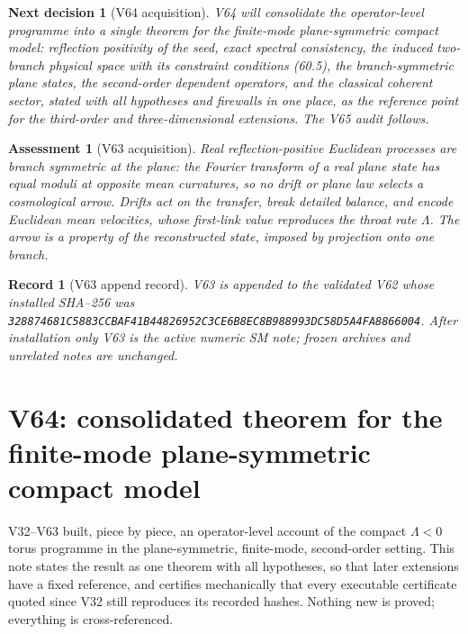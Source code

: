 \documentclass[11pt]{article}
\newtheorem{decision}[theorem]{Next decision}
\newtheorem{assessment}[theorem]{Assessment}
\newtheorem{record}[theorem]{Record}
\theoremstyle{remark}
\begin{document}
\begin{decision}[V64 acquisition]
\label{dec:v19v63-next}
V64 will consolidate the operator-level programme into a single
theorem for the finite-mode plane-symmetric compact model: reflection
positivity of the seed, exact spectral consistency, the induced
two-branch physical space with its constraint conditions (60.5), the
branch-symmetric plane states, the second-order dependent operators,
and the classical coherent sector, stated with all hypotheses and
firewalls in one place, as the reference point for the third-order
and three-dimensional extensions.  The V65 audit follows.
\end{decision}

\begin{assessment}[V63 acquisition]
\label{ass:v19v63}
Real reflection-positive Euclidean processes are branch symmetric at
the plane: the Fourier transform of a real plane state has equal
moduli at opposite mean curvatures, so no drift or plane law selects a
cosmological arrow.  Drifts act on the transfer, break detailed
balance, and encode Euclidean mean velocities, whose first-link value
reproduces the throat rate \(\Lambda\).  The arrow is a property of
the reconstructed state, imposed by projection onto one branch.
\end{assessment}

\begin{record}[V63 append record]
\label{rec:v19v63}
V63 is appended to the validated V62 whose installed SHA--256 was
\texttt{328874681C5883CCBAF41B44826952C3CE6B8EC8B988993DC58D5A4FA8866004}.
After installation only V63 is the active numeric SM note; frozen
archives and unrelated notes are unchanged.
\end{record}


\section{V64: consolidated theorem for the finite-mode plane-symmetric compact model}
\label{sec:v19v64}

V32--V63 built, piece by piece, an operator-level account of the
compact \(\Lambda<0\) torus programme in the plane-symmetric,
finite-mode, second-order setting.  This note states the result as one
theorem with all hypotheses, so that later extensions have a fixed
reference, and certifies mechanically that every executable
certificate quoted since V32 still reproduces its recorded hashes.
Nothing new is proved; everything is cross-referenced.
\end{document}
